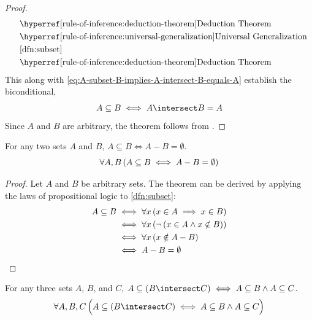 \begin{proof}
\begin{equation*}
\begin{aligned}
            &\quad\text{\aref{rule-of-inference:deduction-theorem}{Deduction Theorem}}\\
            &\quad\text{\aref{rule-of-inference:universal-generalization}{Universal Generalization}}\\
            &\quad\text{\cref{dfn:subset}}\\
            &\quad\text{\aref{rule-of-inference:deduction-theorem}{Deduction Theorem}}
        \end{aligned}
    \end{equation*}
    This along with \eqref{eq:A-subset-B-implies-A-intersect-B-equals-A} establish the biconditional,
    \begin{equation*}
        A \subseteq B \iff A \intersect B = A
    \end{equation*}
    Since \( A \) and \( B \) are arbitrary, the theorem follows from .
\end{proof}

\begin{thm}
    \label{set-identities:subset-in-terms-of-empty-difference}
    For any two sets \( A \) and \( B \), \( A \subseteq B \iff A - B = \emptyset\).
    \begin{equation*}
        \forall A,B \, \mleft( A \subseteq B \iff A - B = \emptyset \mright)
    \end{equation*}
\end{thm}

\begin{proof}
    Let \( A \) and \( B \) be arbitrary sets. The theorem can be derived by applying the laws
    of propositional logic to \cref{dfn:subset}:
    \begin{align*}
        A \subseteq B &\iff \forall x \, \mleft( x \in A \implies x \in B \mright)\\
        &\iff \forall x \, \mleft( \lnot \, \mleft( x \in A \land x \notin B \mright) \mright) \\
        &\iff \forall x \, \mleft( x \notin A - B \mright) \\
        &\iff A - B = \emptyset \qedhere
    \end{align*}
\end{proof}

\begin{thm}
    \label{set-identities:left-distributivity-of-subset-relation-over-intersection}
    For any three sets \( A \), \( B \), and \( C \), \( A \subseteq \mleft( B \intersect C \mright)
    \iff A \subseteq B \land A \subseteq C \).
    \begin{equation*}
        \forall A,B,C \, \Big( A \subseteq \mleft( B \intersect C \mright) \iff
        A \subseteq B \land A \subseteq C \Big)
    \end{equation*}
\end{thm}

